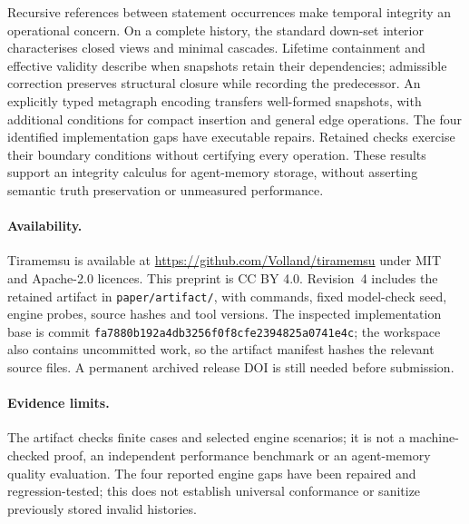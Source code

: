 \documentclass[11pt]{article}
\theoremstyle{plain}
\theoremstyle{definition}
\theoremstyle{remark}
\begin{document}
Recursive references between statement occurrences make temporal integrity an
operational concern. On a complete history, the standard down-set interior
characterises closed views and minimal cascades. Lifetime containment and
effective validity describe when snapshots retain their dependencies; admissible
correction preserves structural closure while recording the predecessor.
An explicitly typed metagraph encoding transfers well-formed snapshots, with
additional conditions for compact insertion and general edge operations.
The four identified implementation gaps have executable repairs. Retained checks
exercise their boundary conditions without certifying every operation. These results
support an integrity calculus for agent-memory storage, without asserting
semantic truth preservation or unmeasured performance.

\paragraph{Availability.} Tiramemsu is available at
\url{https://github.com/Volland/tiramemsu} under MIT and Apache-2.0 licences.
This preprint is CC BY 4.0. Revision~4 includes the retained artifact in
\texttt{paper/artifact/}, with commands, fixed model-check seed, engine probes,
source hashes and tool versions. The inspected implementation base is commit
\texttt{fa7880b192a4db3256f0}\allowbreak\texttt{f8cfe2394825a0741e4c}; the workspace also contains
uncommitted work, so the artifact manifest hashes the relevant source files.
A permanent archived release DOI is still needed before submission.

\paragraph{Evidence limits.} The artifact checks finite cases and selected
engine scenarios; it is not a machine-checked proof, an independent performance
benchmark or an agent-memory quality evaluation. The four reported engine gaps
have been repaired and regression-tested; this does not establish universal
conformance or sanitize previously stored invalid histories.



\end{document}
